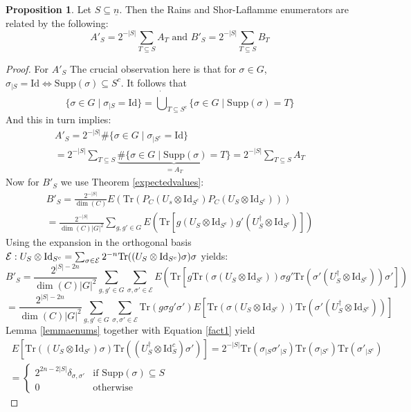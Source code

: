 \documentclass[12pt,a4paper,BCOR15mm,twoside,DIV12]{article}
\def\E{\mathcal{E}}
\def\supp{\text{Supp}}
\def\n{\underline{n}}
\def\Tr{\text{Tr}}
\def\Id{\text{Id}}
\newenvironment{bew}{\begin{proof}[Proof]}{\end{proof}}
\theoremstyle{definition}
\newtheorem{prop}[Satz]{Proposition}
\begin{document}
\begin{prop}\label{lincomb}%
Let $S \subseteq \n$. Then the Rains and Shor-Laflamme enumerators are related by the following: 
\begin{equation} A'_S = 2^{-|S|} \sum_{T \subseteq S} A_T \text{  and  } B'_S = 2^{-|S|} \sum_{T \subseteq S} B_T \end{equation}
\begin{bew}
For $A'_S$ The crucial observation here is that for $\sigma \in G$, $\sigma_{\big| S} = \Id \Leftrightarrow \supp(\sigma) \subseteq S^c$. 
It follows that \[ \{ \sigma \in G \mid \sigma_{\big| S} = \Id \} = \dot \bigcup_{T \subseteq S^c} \{ \sigma \in G \mid \supp(\sigma) = T \} \]
And this in turn implies: 
\begin{align*} A'_S = 2^{-|S|} \#\{ \sigma \in G \mid \sigma_{\big| S^c} = \Id \} \\ = 2^{-|S|} \sum_{T \subseteq S} \underbrace{ \# \{ \sigma \in G \mid \supp(\sigma)=T \} }_{= A_T} = 2^{-|S|} \sum_{T \subseteq S} A_T \end{align*}
Now for $B'_S$ we use Theorem \ref{expectedvalues}:
\begin{align*} B'_S = \frac{2^{-|S|}}{\dim (C)} E( \Tr( P_C (U_s \otimes \Id_{S^c}) P_C (U_S \otimes \Id_{S^c}) ) ) \\ = \frac{2^{-|S|}}{\dim (C) |G|^2} \sum_{g,g' \in G} E( \Tr[ g (U_S \otimes \Id_{S^c}) g' (U^\dagger_S \otimes \Id_{S^c}) ] ) \end{align*}
Using the expansion in the orthogonal basis $\E: U_S \otimes \Id_{S^c} \\ = \sum_{\sigma \in \E} 2^{-n} \Tr( (U_S \otimes \Id_{S^c}) \sigma) \sigma$ yields: 
\[B'_S = \frac{2^{|S|-2n}}{\dim (C) |G|^2} \sum_{g,g' \in G} \sum_{\sigma, \sigma' \in \E} E( \Tr[ g \Tr(\sigma (U_S \otimes \Id_{S^c}))\sigma  g' \Tr(\sigma' (U_S^\dagger \otimes \Id_{S^c}))\sigma' ] ) \]
\[  = \frac{2^{|S|-2n}}{\dim (C) |G|^2} \sum_{g,g' \in G} \sum_{\sigma, \sigma' \in \E} \Tr( g \sigma  g' \sigma')  E[ \Tr(\sigma (U_S \otimes \Id_{S^c})) \Tr(\sigma' (U_S^\dagger \otimes \Id_{S^c})) ]  \]
Lemma \ref{lemmaenums} together with Equation \ref{fact1} yield
 \begin{align*} \ E[ \Tr((U_S \otimes \Id_{S^c})\sigma) \Tr((U_S^\dagger \otimes \Id_S^c)\sigma' )] = 2^{-|S|} \Tr(\sigma_{\big| S} \sigma'_{\big| S}) \Tr(\sigma_{\big| S^c}) \Tr(\sigma'_{\big| S^c}) \\ = 
\left\{ \begin{array}{lr} 2^{2n - 2|S|} \delta_{\sigma,\sigma'} & \text{if } \supp(\sigma) \subseteq S \\  0 & \text{otherwise} \end{array} \right.  \end{align*}

\end{bew}
\end{prop}
\end{document}
